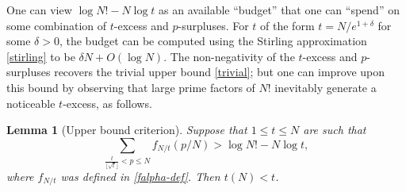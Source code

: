 \documentclass[12pt,a4paper,reqno]{amsart}
\numberwithin{equation}{section}
\theoremstyle{plain}
\newtheorem{lemma}[theorem]{Lemma}
\theoremstyle{definition}
\begin{document}
One can view $\log N! - N\log t$ as an available ``budget'' that one can ``spend'' on some combination of $t$-excess and $p$-surpluses.  For $t$ of the form $t = N/e^{1+\delta}$ for some $\delta>0$, the budget can be computed using the Stirling approximation \eqref{stirling} to be $\delta N + O(\log N)$.  The non-negativity of the $t$-excess and $p$-surpluses recovers the trivial upper bound \eqref{trivial}; but one can improve upon this bound by observing that large prime factors of $N!$ inevitably generate a noticeable $t$-excess, as follows.  

\begin{lemma}[Upper bound criterion]\label{upper-crit}  Suppose that $1 \leq t \leq N$ are such that
  \begin{equation}\label{contra}
     \sum_{\frac{t}{\lfloor\sqrt{t}\rfloor} < p \leq N} f_{N/t}(p/N) > \log N! - N \log t,
  \end{equation}
  where $f_{N/t}$ was defined in \eqref{falpha-def}.
  Then $t(N) < t$.
  \end{lemma}
\end{document}
